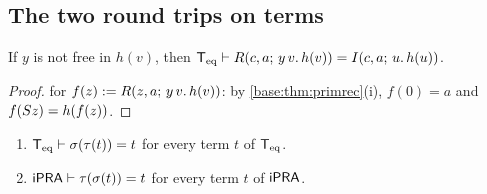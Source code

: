 \subsection{The two round trips on terms}

\begin{lemma}
\label{base:lem:prc-iter}
If $y$ is not free in $h(v)$, then
$\mathsf{T}_{\mathrm{eq}}\vdash R(c,a;\,y\,v.\,h(v))=I(c,a;\,u.\,h(u))$.
\end{lemma}

\begin{proof}
 for $f(z)\mathrel{:=} R(z,a;\,y\,v.\,h(v))$: by
\cref{base:thm:primrec}(i), $f(0)=a$ and $f(S z)=h(f(z))$.
\end{proof}

\begin{proposition}
\label{base:prop:termrt}
\begin{enumerate}[label=\textup{(\roman*)}]
\item $\mathsf{T}_{\mathrm{eq}}\vdash\sigma(\tau(t))=t$ for every term $t$ of $\mathsf{T}_{\mathrm{eq}}$.
\item $\mathsf{iPRA}\vdash\tau(\sigma(t))=t$ for every term $t$ of $\mathsf{iPRA}$.
\end{enumerate}
\end{proposition}

